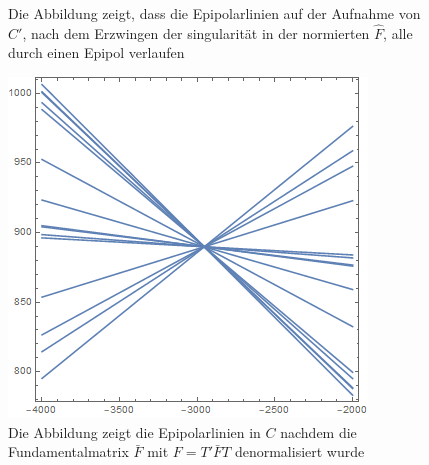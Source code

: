 \begin{figure}[!htb]
	\caption[Epipolarlinien in $C'$ aus singulärer Fundamentalmatrix ]{Die Abbildung zeigt, dass die Epipolarlinien auf der Aufnahme von $C'$, nach dem Erzwingen der singularität in der normierten $\hat{F}$, alle durch einen Epipol verlaufen}
	\label{fig:EpipoleWithF2}
	\endminipage\hfill
\end{figure}

\begin{figure}[!htb]
	\includegraphics[width=\linewidth]{images/L_PC1_F_Constraint_denormalized.png}
	\caption[Epipolarlinien in $C$ aus singulärer denormalisierter Fundamentalmatrix]{Die Abbildung zeigt die Epipolarlinien in $C$ nachdem die Fundamentalmatrix $\bar{F}$ mit $F = T'\bar{F}T$ denormalisiert wurde}
	\label{fig:EpipoleWithF1Denorm}
	\endminipage\hfill

\end{figure}
